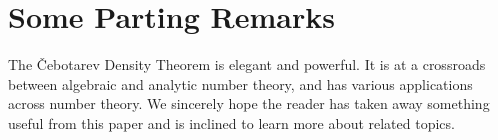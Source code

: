 \documentclass{article}
\theoremstyle{plain}
\theoremstyle{definition}
\theoremstyle{remark}
\numberwithin{equation}{section}
\numberwithin{thm}{section}
\begin{document}
\section{Some Parting Remarks}

The Čebotarev Density Theorem is elegant and powerful. It is at a crossroads between algebraic and analytic number theory, and has various applications across number theory. We sincerely hope the reader has taken away something useful from this paper and is inclined
to learn more about related topics.

  


\end{document}

